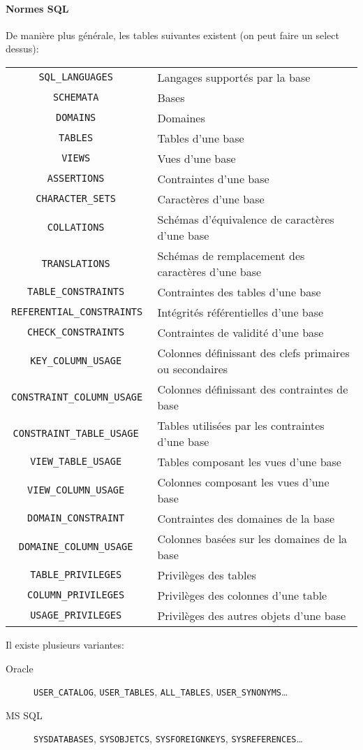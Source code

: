 \documentclass[10pt,a4paper,french]{article}
\begin{document}
\paragraph{Normes SQL} De manière plus générale, les tables suivantes existent (on peut faire un \gls{select} dessus):
\begin{tabular}{c|l}
\tt SQL\_LANGUAGES & Langages supportés par la base\\
\tt SCHEMATA & Bases \\
\tt DOMAINS & Domaines \\
\tt TABLES & Tables d'une base \\
\tt VIEWS & Vues d'une base \\
\tt ASSERTIONS & Contraintes d'une base \\
\tt CHARACTER\_SETS & Caractères d'une base \\
\tt COLLATIONS & Schémas d'équivalence de caractères d'une base \\
\tt TRANSLATIONS & Schémas de remplacement des caractères d'une base \\
\tt TABLE\_CONSTRAINTS & Contraintes des tables d'une base \\
\tt REFERENTIAL\_CONSTRAINTS & Intégrités référentielles d'une base \\
\tt CHECK\_CONSTRAINTS & Contraintes de validité d'une base \\
\tt KEY\_COLUMN\_USAGE & Colonnes définissant des clefs primaires ou secondaires \\
\tt CONSTRAINT\_COLUMN\_USAGE & Colonnes définissant des contraintes de base \\
\tt CONSTRAINT\_TABLE\_USAGE & Tables utilisées par les contraintes d'une base \\
\tt VIEW\_TABLE\_USAGE & Tables composant les vues d'une base \\
\tt VIEW\_COLUMN\_USAGE & Colonnes composant les vues d'une base\\
\tt DOMAIN\_CONSTRAINT & Contraintes des domaines de la base\\
\tt DOMAINE\_COLUMN\_USAGE & Colonnes basées sur les domaines de la base\\
\tt TABLE\_PRIVILEGES & Privilèges des tables\\
\tt COLUMN\_PRIVILEGES & Privilèges des colonnes d'une table\\
\tt USAGE\_PRIVILEGES & Privilèges des autres objets d'une base
\end{tabular}

Il existe plusieurs variantes:
\begin{description}
\item[Oracle] {\tt USER\_CATALOG}, {\tt USER\_TABLES}, {\tt ALL\_TABLES}, {\tt USER\_SYNONYMS}\ldots
\item[MS SQL] {\tt SYSDATABASES}, {\tt SYSOBJETCS}, {\tt SYSFOREIGNKEYS}, {\tt SYSREFERENCES}\ldots
\end{description}
\end{document}
